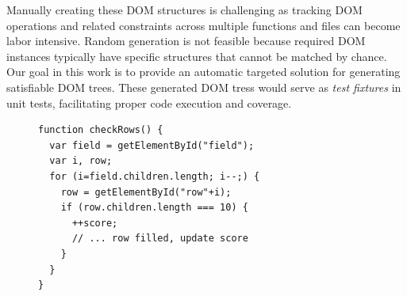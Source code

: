 
Manually creating these DOM structures is challenging as tracking DOM operations and related constraints across multiple \js functions and files can become labor intensive.  Random generation is not feasible because required DOM instances typically have  specific structures that cannot be matched by chance. 
Our goal in this work is to provide an automatic targeted solution for generating satisfiable DOM trees. These generated DOM tress would serve as \emph{test fixtures} in unit tests, facilitating proper \js code execution and coverage.


\begin{figure}[t]
\centering
\begin{lstlisting}[caption=DOM structure dependent \js execution paths. 
%{\tt getElementById()} is equivalent to {\tt document.getElementById()}.
,label=dom0]
function checkRows() {
  var field = getElementById("field"); 
  var i, row;
  for (i=field.children.length; i--;) {
    row = getElementById("row"+i);
    if (row.children.length === 10) {
      ++score;
      // ... row filled, update score
    }
  }
}
\end{lstlisting}
\end{figure}

